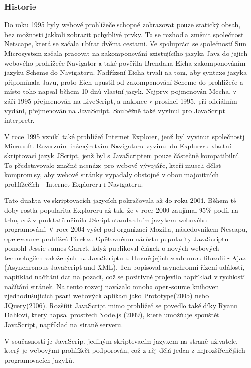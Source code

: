 \documentclass[main.tex]{subfiles}
\begin{document}
\subsubsection{Historie}
Do roku 1995 byly webové prohlížeče schopné zobrazovat pouze statický obsah, bez možnosti jakkoli zobrazit pohyblivé prvky. To se rozhodla změnit společnost Netscape, která se začala ubírat dvěma cestami. Ve spolupráci se společností Sun Microsystem začala pracovat na zakomponování existujícího jazyka Java do jejich webového prohlížeče Navigator a také pověřila Brendana Eicha zakomponováním jazyku Scheme do Navigatoru. Nadřízení Eicha trvali na tom, aby syntaxe jazyka připomínala Javu, proto Eich upustil od zakomponování Scheme do prohlížeče a místo toho napsal během 10 dnů vlastní jazyk. Nejprve pojmenován Mocha, v září 1995 přejmenován na LiveScript, a nakonec v prosinci 1995, při oficiálním vydání, přejmenován na JavaScript. Souběžně také vyvinul pro JavaScript interpretr.

V roce 1995 vznikl také prohlížeč Internet Explorer, jenž byl vyvinut společnostj Microsoft. Reverzním inženýrstvím Navigatoru vyvinul do Exploreru vlastní skriptovací jazyk JScript, jenž byl s JavaScriptem pouze částečně kompatibilní. To představovalo značné nesnáze pro webové vývojáře, kteří museli dělat kompromisy, aby webové stránky vypadaly obstojně v obou majoritních prohlížečích - Internet Exploreru i Navigatoru. 

Tato dualita ve skriptovacích jazycích pokračovala až do roku 2004. Během té doby rostla popularita Exploreru až tak, že v roce 2000 zaujímal 95\% podíl na trhu, což v podstatě učinilo JScript standardním jazykem webového programování. V roce 2004 vyšel pod organizací Mozilla, následovníkem Nescapu, open-source prohlížeč Firefox. 
Opětovnému nárůstu popularity JavaScriptu pomohl Jessie James Garret, když publikoval článek o nových webových technologiích založených na JavaScriptu a hlavně jejich souhrnnou filozofii - Ajax (Asynchronous JavaScript and XML). Ten popisoval asynchronní řízení událostí, například načítání dat na pozadí, což se pozitivně projevilo například v rychlosti načítání stránek. Na tento rozvoj navázalo mnoho open-source knihoven zjednodušujících psaní webových aplikací jako Prototype(2005) nebo JQuery(2006).
Rozšířit JavaScript mimo prohlížeč se povedlo také díky Ryanu Dahlovi, který napsal prostředí Node.js (2009), které umožňuje spouštět JavaScript, například na straně serveru. \cite{web:wik:cz:js, web:wik:en:js} 

V současnosti je JavaScript jediným skriptovacím jazykem na straně uživatele, který je webovými prohlížeči podporován, což z něj dělá jeden z nejrozšířenějších programovacích jazyků. \cite{web:wik:cz:js} 

\end{document}
